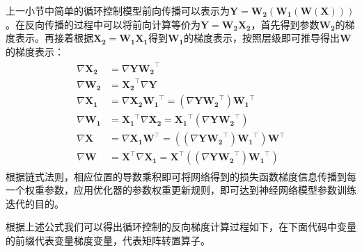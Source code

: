 \documentclass[letterpaper,10pt,english]{sphinxmanual}
\begin{document}
\sphinxAtStartPar
上一小节中简单的循环控制模型前向传播可以表示为\(\boldsymbol{Y}=\boldsymbol{W_2}(\boldsymbol{W_1}(\boldsymbol{W}(\boldsymbol{X})))\)。在反向传播的过程中可以将前向计算等价为\(\boldsymbol{Y}=\boldsymbol{W_2}\boldsymbol{X_2}\)，首先得到参数\(\boldsymbol{W_2}\)的梯度表示。再接着根据\(\boldsymbol{X_2}=\boldsymbol{W_1}\boldsymbol{X_1}\)得到\(\boldsymbol{W_1}\)的梯度表示，按照层级即可推导得出\(\boldsymbol{W}\)的梯度表示：
\begin{equation}\label{equation:chapter_computational_graph/components_of_computational_graph:chapter_computational_graph/components_of_computational_graph:3}
\begin{split}\begin{aligned}
\nabla\boldsymbol{X_2} &= \nabla\boldsymbol{Y}\boldsymbol{W_2}^\top  \\
\nabla\boldsymbol{W_2} &= \boldsymbol{X_2}^\top\nabla\boldsymbol{Y}   \\
\nabla\boldsymbol{X_1} &= \nabla\boldsymbol{X_2}\boldsymbol{W_1}^\top = (\nabla\boldsymbol{Y}\boldsymbol{W_2}^\top)\boldsymbol{W_1}^\top   \\
\nabla\boldsymbol{W_1} &= \boldsymbol{X_1}^\top\nabla\boldsymbol{X_2} = \boldsymbol{X_1}^\top(\nabla\boldsymbol{Y}\boldsymbol{W_2}^\top)  \\
\nabla\boldsymbol{X} &= \nabla\boldsymbol{X_1}\boldsymbol{W}^\top = ((\nabla\boldsymbol{Y}\boldsymbol{W_2}^\top)\boldsymbol{W_1}^\top)\boldsymbol{W}^\top   \\
\nabla\boldsymbol{W} &= \boldsymbol{X}^\top\nabla\boldsymbol{X_1} = \boldsymbol{X}^\top((\nabla\boldsymbol{Y}\boldsymbol{W_2}^\top)\boldsymbol{W_1}^\top)
\end{aligned}\end{split}
\end{equation}
\sphinxAtStartPar
根据链式法则，相应位置的导数乘积即可将网络得到的损失函数梯度信息传播到每一个权重参数，应用优化器的参数权重更新规则，即可达到神经网络模型参数训练迭代的目的。

\sphinxAtStartPar
根据上述公式我们可以得出循环控制的反向梯度计算过程如下，在下面代码中变量的前缀代表变量梯度变量，代表矩阵转置算子。
\end{document}
